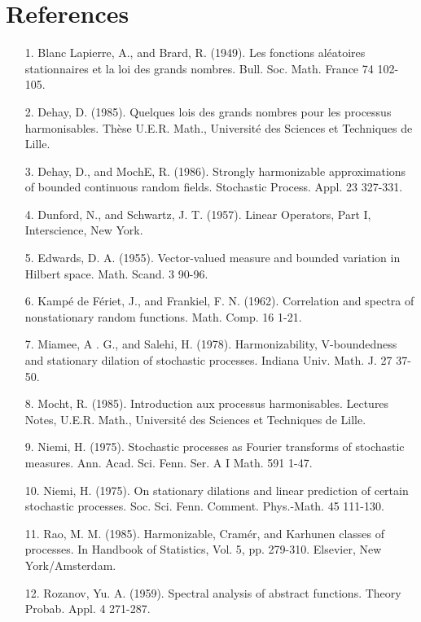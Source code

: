 \documentclass{article}
\begin{document}
\section*{References}
\begin{enumerate}
    \item[1.] Blanc Lapierre, A., and Brard, R. (1949). Les fonctions aléatoires stationnaires et la loi des grands nombres. Bull. Soc. Math. France 74 102-105.
    \item[2.] Dehay, D. (1985). Quelques lois des grands nombres pour les processus harmonisables. Thèse U.E.R. Math., Université des Sciences et Techniques de Lille.
    \item[3.] Dehay, D., and MochE, R. (1986). Strongly harmonizable approximations of bounded continuous random fields. Stochastic Process. Appl. 23 327-331.
    \item[4.] Dunford, N., and Schwartz, J. T. (1957). Linear Operators, Part I, Interscience, New York.
    \item[5.] Edwards, D. A. (1955). Vector-valued measure and bounded variation in Hilbert space. Math. Scand. 3 90-96.
    \item[6.] Kampé de Fériet, J., and Frankiel, F. N. (1962). Correlation and spectra of nonstationary random functions. Math. Comp. 16 1-21.
    \item[7.] Miamee, A . G., and Salehi, H. (1978). Harmonizability, V-boundedness and stationary dilation of stochastic processes. Indiana Univ. Math. J. 27 37-50.
    \item[8.] Mocht, R. (1985). Introduction aux processus harmonisables. Lectures Notes, U.E.R. Math., Université des Sciences et Techniques de Lille.
    \item[9.] Niemi, H. (1975). Stochastic processes as Fourier transforms of stochastic measures. Ann. Acad. Sci. Fenn. Ser. A I Math. 591 1-47.
    \item[10.] Niemi, H. (1975). On stationary dilations and linear prediction of certain stochastic processes. Soc. Sci. Fenn. Comment. Phys.-Math. 45 111-130.
    \item[11.] Rao, M. M. (1985). Harmonizable, Cramér, and Karhunen classes of processes. In Handbook of Statistics, Vol. 5, pp. 279-310. Elsevier, New York/Amsterdam.
    \item[12.] Rozanov, Yu. A. (1959). Spectral analysis of abstract functions. Theory Probab. Appl. 4 271-287.
\end{enumerate}
\end{document}
